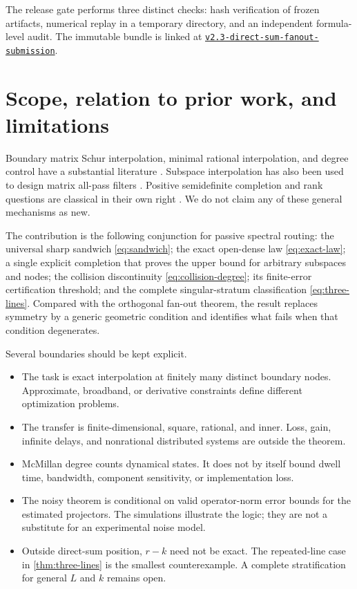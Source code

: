 \documentclass[11pt]{article}
\theoremstyle{definition}
\theoremstyle{remark}
\begin{document}
The release gate performs three distinct checks: hash verification of frozen
artifacts, numerical replay in a temporary directory, and an independent
formula-level audit.  The immutable bundle is linked at
\href{https://github.com/lluiseriksson/finite-sample-spectral-certificates/releases/tag/v2.3-direct-sum-fanout-submission}{\texttt{v2.3-direct-sum-fanout-submission}}.

\section{Scope, relation to prior work, and limitations}\label{sec:scope}

Boundary matrix Schur interpolation, minimal rational interpolation, and
degree control have a substantial literature
\cite{BolotnikovDym2006,AntoulasEtAl1990,BallKim1994,
GombaniMichaletzky2007,BallBolotnikov2018}.  Subspace interpolation has also
been used to design matrix all-pass filters
\cite{RapisardaWillems1997,BharathEtAl2023}.  Positive semidefinite completion
and rank questions are classical in their own right \cite{Dancis1992}.
We do not claim any of these
general mechanisms as new.

The contribution is the following conjunction for passive spectral routing:
the universal sharp sandwich \eqref{eq:sandwich}; the exact open-dense law
\eqref{eq:exact-law}; a single explicit completion that proves the upper
bound for arbitrary subspaces and nodes; the collision discontinuity
\eqref{eq:collision-degree}; its finite-error certification threshold; and
the complete singular-stratum classification \eqref{eq:three-lines}.
Compared with the orthogonal fan-out theorem, the result replaces symmetry
by a generic geometric condition and identifies what fails when that
condition degenerates.

Several boundaries should be kept explicit.
\begin{itemize}
\item The task is exact interpolation at finitely many distinct boundary
      nodes.  Approximate, broadband, or derivative constraints define
      different optimization problems.
\item The transfer is finite-dimensional, square, rational, and inner.
      Loss, gain, infinite delays, and nonrational distributed systems are
      outside the theorem.
\item McMillan degree counts dynamical states.  It does not by itself bound
      dwell time, bandwidth, component sensitivity, or implementation loss.
\item The noisy theorem is conditional on valid operator-norm error bounds
      for the estimated projectors.  The simulations illustrate
      the logic; they are not a substitute for an experimental noise model.
\item Outside direct-sum position, $r-k$ need not be exact.  The repeated-line case in
      \cref{thm:three-lines} is the smallest counterexample.  A complete
      stratification for general $L$ and $k$ remains open.
\end{itemize}
\end{document}
